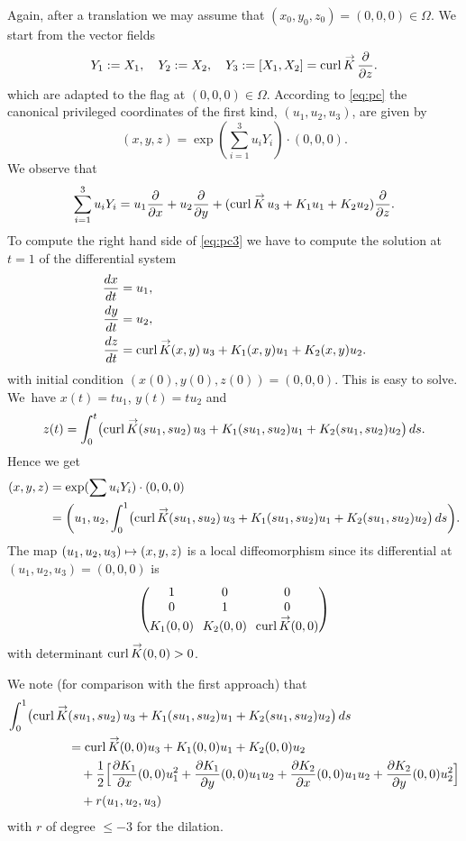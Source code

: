 \documentclass[11pt]{article}
\newcommand\mto{\mathchoice{\longmapsto}{\mapsto}{\mapsto}{\mapsto}}
\DeclareMathOperator{\curl}{curl}
\renewcommand{\vec}[1]
{\overset{\,{\raisebox{-2pt}{$\scriptstyle\to$}}}{#1}}
\theoremstyle{definition}
\newcommand{\1}{\mathbbm{1}}
\numberwithin{equation}{section}
\begin{document}
Again, after a translation we may assume that $(x_0,y_0,z_0)= (0,0,0)\in\Omega$.
We start from the vector fields
\[
Y_1:=X_1,\quad
Y_2:=X_2,\quad
Y_3:=[X_1,X_2] = \curl \vec K\,\frac{\partial}{\partial z}.
\]
which are adapted to the flag at $(0,0,0)\in\Omega$. According to \eqref{eq:pc} the canonical privileged coordinates of the first kind, $(u_1,u_2,u_3)$, are given by
\begin{equation}\label{eq:pc3}
(x,y,z)= \exp (\sum_{i=1}^3 u_{i}Y_i) \cdot (0,0,0).
\end{equation}
We observe that
\[
\sum_{i=1}^3 u_{i}Y_i = u_1 \frac{\partial}{\partial x} + u_2 \frac{\partial}{\partial y} +(\curl \vec K\,u_3 + K_1 u_1 + K_2 u_2) \frac{\partial}{\partial z}.
\]
To compute the right hand side of \eqref{eq:pc3} we have to compute the solution at $t=1$ of the differential system
\begin{align*}
\frac{dx}{dt} &=u_1,\\
\frac{dy}{dt} &=u_2, \\
\frac{dz}{dt} &= \curl \vec K (x,y)\,u_3 + K_1(x,y) u_1 + K_2 (x,y)u_2.
\end{align*}
with initial condition $(x(0),y(0),z(0))=(0,0,0)$.
This is easy to solve. We~have $x(t)= tu_1$, $y(t) =t u_2$ and
\[
z(t) = \int_0^t \bigl(\curl \vec K (su_1,su_2)\,u_3 + K_1(su_1,su_2) u_1 + K_2 (su_1,su_2)u_2\bigr)\,ds.
\]
Hence we get
\begin{align*}
(x,y,z) & =\exp (\sum u_{i}Y_i) \cdot (0,0,0)\\
&= \biggl(u_1,u_2, \int_0^1\bigl(\curl \vec K (su_1,su_2)\,u_3 + K_1(su_1,su_2) u_1 + K_2 (su_1,su_2)u_2\bigr) \,ds\biggr).
\end{align*}
The map $(u_1,u_2,u_3) \mto (x,y,z)$ is a local diffeomorphism since its differential at $(u_1,u_2,u_3)=(0,0,0)$ is
\[\arraycolsep3.5pt
\begin{pmatrix}
1&0&0\\
0&1&0\\
K_1(0,0)&K_2(0,0)&\curl \vec K (0,0)
\end{pmatrix}
\]
with determinant $\curl \vec K (0,0)>0$.

We note (for comparison with the first approach) that
\begin{align*}
\int_0^1\bigl(\curl \vec K &(su_1,su_2)\,u_3 + K_1(su_1,su_2) u_1 + K_2 (su_1,su_2)u_2\bigr)\,ds \\
& = \curl \vec K (0,0) u_3 + K_1(0,0) u_1+ K_2(0,0) u_2\\
& \quad
+ \frac12 \Big[ \frac{\partial K_1}{\partial x}(0,0) u_1^2+ \frac{\partial K_1}{\partial y}(0,0) u_1u_2 + \frac{\partial K_2}{\partial x}(0,0) u_1u_2 + \frac{\partial K_2}{\partial y}(0,0) u_2^2\Big]\\
& \quad + r(u_1,u_2,u_3)
\end{align*}
with $r$ of degree $\leq -3$ for the dilation.
\end{document}
